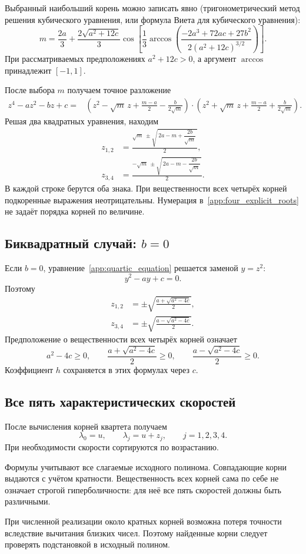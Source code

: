 \documentclass[11pt,a4paper]{article}
\begin{document}
Выбранный наибольший корень можно записать явно (тригонометрический метод решения кубического уравнения, или формула Виета для кубического уравнения):
\[
m=
\frac{2a}{3}
+\frac{2\sqrt{a^2+12c}}{3}
\cos\!\left[
\frac13\arccos\!\left(
\frac{-2a^3+72ac+27b^2}
{2(a^2+12c)^{3/2}}
\right)
\right].
\]
При рассматриваемых предположениях
$a^2+12c>0$, а аргумент $\arccos$ принадлежит $[-1,1]$.

После выбора $m$ получаем точное разложение
\[
\begin{aligned}
z^4-az^2-bz+c
={}&
\left(
z^2-\sqrt m\,z+\frac{m-a}{2}
-\frac{b}{2\sqrt m}
\right)\cdot
\left(
z^2+\sqrt m\,z+\frac{m-a}{2}
+\frac{b}{2\sqrt m}
\right).
\end{aligned}
\]
Решая два квадратных уравнения, находим
\begin{equation}
\begin{aligned}
z_{1,2}
&=
\frac{
\sqrt m\ \pm
\sqrt{\,2a-m+\dfrac{2b}{\sqrt m}\,}
}{2},
\\[6pt]
z_{3,4}
&=
\frac{
-\sqrt m\ \pm
\sqrt{\,2a-m-\dfrac{2b}{\sqrt m}\,}
}{2}.
\end{aligned}
\label{app:four_explicit_roots}
\end{equation}
В каждой строке берутся оба знака.
При вещественности всех четырёх корней
подкоренные выражения неотрицательны.
Нумерация в~\eqref{app:four_explicit_roots}
не задаёт порядка корней по величине.

\subsection{Биквадратный случай: $b=0$}

Если $b=0$, уравнение~\eqref{app:quartic_equation}
решается заменой $y=z^2$:
\[
y^2-ay+c=0.
\]
Поэтому
\[
\begin{aligned}
z_{1,2}
&=\pm\sqrt{\frac{a+\sqrt{a^2-4c}}{2}},\\[5pt]
z_{3,4}
&=\pm\sqrt{\frac{a-\sqrt{a^2-4c}}{2}}.
\end{aligned}
\]
Предположение о вещественности всех четырёх корней
означает
\[
a^2-4c\ge0,
\qquad
\frac{a+\sqrt{a^2-4c}}2\ge0,
\qquad
\frac{a-\sqrt{a^2-4c}}2\ge0.
\]
Коэффициент $h$ сохраняется в этих формулах через $c$.

\subsection{Все пять характеристических скоростей}

После вычисления корней квартета получаем
\[
\lambda_0=u,\qquad
\lambda_j=u+z_j,\qquad j=1,2,3,4.
\]
При необходимости скорости сортируются по возрастанию.

Формулы учитывают все слагаемые исходного полинома.
Совпадающие корни выдаются с учётом кратности.
Вещественность всех корней сама по себе не означает
строгой гиперболичности: для неё все пять скоростей
должны быть различными.

При численной реализации около кратных корней
возможна потеря точности вследствие вычитания близких
чисел. Поэтому найденные корни следует проверять
подстановкой в исходный полином.
\end{document}

